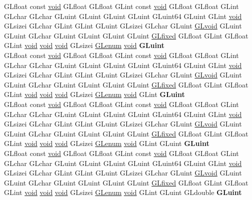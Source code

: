 \begin{DoxyCompactItemize}
\begin{tabbing}
\>GLfloat const \hyperlink{interfacevoid}{void} GLfloat GLfloat GLint const \hyperlink{interfacevoid}{void} GLfloat GLfloat GLint GLchar GLchar GLuint GLuint GLuint GLuint GLuint64 GLuint GLint \hyperlink{interfacevoid}{void} GLsizei GLchar GLint GLint GLuint GLsizei GLchar GLuint \hyperlink{interfacevoid}{GLvoid} GLuint GLuint GLchar GLuint GLuint GLuint GLuint \hyperlink{glheader_8h_ad6d3fa892df40dedf48ee6d84529ae5e}{GLfixed} GLfloat GLint GLfloat GLint \hyperlink{interfacevoid}{void} \hyperlink{interfacevoid}{void} \hyperlink{interfacevoid}{void} GLsizei \hyperlink{interfacevoid}{GLenum} \hyperlink{interfacevoid}{void} {\bfseries GLuint}\\
\>GLfloat const \hyperlink{interfacevoid}{void} GLfloat GLfloat GLint const \hyperlink{interfacevoid}{void} GLfloat GLfloat GLint GLchar GLchar GLuint GLuint GLuint GLuint GLuint64 GLuint GLint \hyperlink{interfacevoid}{void} GLsizei GLchar GLint GLint GLuint GLsizei GLchar GLuint \hyperlink{interfacevoid}{GLvoid} GLuint GLuint GLchar GLuint GLuint GLuint GLuint \hyperlink{glheader_8h_ad6d3fa892df40dedf48ee6d84529ae5e}{GLfixed} GLfloat GLint GLfloat GLint \hyperlink{interfacevoid}{void} \hyperlink{interfacevoid}{void} \hyperlink{interfacevoid}{void} GLsizei \hyperlink{interfacevoid}{GLenum} \hyperlink{interfacevoid}{void} GLint {\bfseries GLuint}\\
\>GLfloat const \hyperlink{interfacevoid}{void} GLfloat GLfloat GLint const \hyperlink{interfacevoid}{void} GLfloat GLfloat GLint GLchar GLchar GLuint GLuint GLuint GLuint GLuint64 GLuint GLint \hyperlink{interfacevoid}{void} GLsizei GLchar GLint GLint GLuint GLsizei GLchar GLuint \hyperlink{interfacevoid}{GLvoid} GLuint GLuint GLchar GLuint GLuint GLuint GLuint \hyperlink{glheader_8h_ad6d3fa892df40dedf48ee6d84529ae5e}{GLfixed} GLfloat GLint GLfloat GLint \hyperlink{interfacevoid}{void} \hyperlink{interfacevoid}{void} \hyperlink{interfacevoid}{void} GLsizei \hyperlink{interfacevoid}{GLenum} \hyperlink{interfacevoid}{void} GLint GLuint {\bfseries GLuint}\\
\>GLfloat const \hyperlink{interfacevoid}{void} GLfloat GLfloat GLint const \hyperlink{interfacevoid}{void} GLfloat GLfloat GLint GLchar GLchar GLuint GLuint GLuint GLuint GLuint64 GLuint GLint \hyperlink{interfacevoid}{void} GLsizei GLchar GLint GLint GLuint GLsizei GLchar GLuint \hyperlink{interfacevoid}{GLvoid} GLuint GLuint GLchar GLuint GLuint GLuint GLuint \hyperlink{glheader_8h_ad6d3fa892df40dedf48ee6d84529ae5e}{GLfixed} GLfloat GLint GLfloat GLint \hyperlink{interfacevoid}{void} \hyperlink{interfacevoid}{void} \hyperlink{interfacevoid}{void} GLsizei \hyperlink{interfacevoid}{GLenum} \hyperlink{interfacevoid}{void} GLint GLuint GLdouble {\bfseries GLuint}\\

\end{tabbing}
\end{DoxyCompactItemize}
